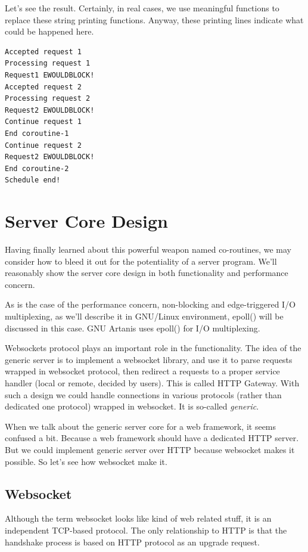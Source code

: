 \documentclass[numbers,numberedpars]{sigplanconf}
\begin{document}
Let's see the result. Certainly, in real cases, we use meaningful functions to replace these string printing functions. Anyway, these printing
lines indicate what could be happened here.

\begin{lstlisting}[caption=Coroutines running result]
Accepted request 1
Processing request 1
Request1 EWOULDBLOCK!
Accepted request 2
Processing request 2
Request2 EWOULDBLOCK!
Continue request 1
End coroutine-1
Continue request 2
Request2 EWOULDBLOCK!
End coroutine-2
Schedule end!
\end{lstlisting}

\section{Server Core Design}

Having finally learned about this powerful weapon named co-routines, we may consider how to bleed it out for the potentiality of a server program.
We'll reasonably show the server core design in both functionality and performance concern.

As is the case of the performance concern, non-blocking and edge-triggered I/O multiplexing, as we'll describe it in GNU/Linux environment, epoll()
will be discussed in this case. GNU Artanis uses epoll() for I/O multiplexing.

Websockets protocol plays an important role in the functionality.
The idea of the generic server is to implement a websocket library, and use it to parse requests wrapped in websocket protocol, then redirect
a requests to a proper service handler (local or remote, decided by users). This is called HTTP Gateway. With such a design we could handle
connections in various protocols (rather than dedicated one protocol) wrapped in websocket. It is so-called {\it generic}.

When we talk about the generic server core for a web framework, it seems confused a bit. Because a web framework should have a dedicated HTTP
server. But we could implement generic server over HTTP because websocket makes it possible. So let's see how websocket make it.

\subsection{Websocket} \label{Websocket}

Although the term websocket looks like kind of web related stuff, it is an independent TCP-based protocol.
The only relationship to HTTP is that the handshake process is based on HTTP protocol as an upgrade request.
\end{document}
